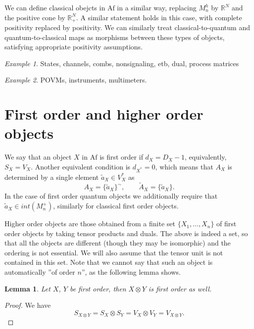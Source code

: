 \documentclass[12pt]{article}
\newtheorem{lemma}{Lemma}
\theoremstyle{definition}
\theoremstyle{remark}
\newtheorem{exm}{Example}
\def \Af{\mathrm{Af}}
\begin{document}
We can define classical obejcts in $\Af$ in a similar way, replacing $M_n^h$ by $\mathbb
R^N$ and the positive cone by $\mathbb R_+^N$. A similar statement holds in this case,
with complete positivity replaced by positivity. We can similarly treat
classical-to-quantum and quantum-to-classical maps as morphisms between these types of
objects, satisfying appropriate positivity assumptions.

\begin{exm}\label{exm:quantum_maps} States, channels, combs, nonsignaling, etb, dual, process
matrices

\end{exm}

\begin{exm}\label{exm:qccq} POVMs, instruments, multimeters.


\end{exm}


\section{First order and higher order objects}


We say that an object $X$ in $\Af$ is first order if $d_X=D_X-1$, equivalently, $S_X=V_X$.
Another equivalent condition is $d_{X^*}=0$, which means that $A_X$ is determined by a
single element $\tilde a_X\in V_X^*$ as 
\[
A_X=\{\tilde a_X\}^\sim,\qquad \tilde A_X=\{\tilde a_X\}.
\]
In the case of first order quantum objects we additionally require that $\tilde a_X\in
int(M_n^+)$, similarly for classical first order objects.

Higher order objects are those obtained from a finite set $\{X_1,\dots,X_n\}$ of first order objects by
taking tensor products and duals. The above is indeed a set, so that all the objects are
different (though they may be isomorphic) and the ordering is not essential. We will also
assume that the tensor unit is not contained in this set. Note that we cannot say that
such an object is automatically ''of order $n$'', as the following lemma shows. 

\begin{lemma}\label{lemma:1ordertensor} Let $X$, $Y$ be first order, then $X\otimes Y$ is
first order as well.

\end{lemma}

\begin{proof} We have
\[
S_{X\otimes Y}=S_X\otimes S_Y=V_X\otimes V_Y=V_{X\otimes Y}.
\]

\end{proof}
\end{document}
